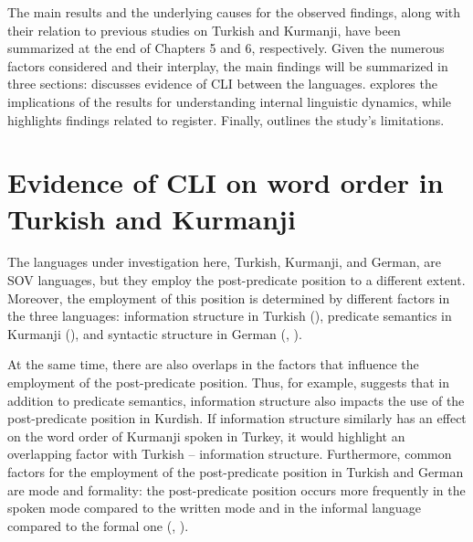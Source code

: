 The main results and the underlying causes for the observed findings, along with their relation to previous studies on Turkish and Kurmanji, have been summarized at the end of Chapters 5 and 6, respectively. Given the numerous factors considered and their interplay, the main findings will be summarized in three sections:  discusses evidence of CLI between the languages.  explores the implications of the results for understanding internal linguistic dynamics, while  highlights findings related to register. Finally,  outlines the study’s limitations.

\section{Evidence of CLI on word order in Turkish and Kurmanji}\label{sec:key:7.1}

The languages under investigation here, Turkish, Kurmanji, and German, are SOV languages, but they employ the post-predicate position to a different extent. Moreover, the employment of this position is determined by different factors in the three languages: information structure in Turkish (\citealt{Erguvanli1984, Erku1983, Issever2003}), predicate semantics in Kurmanji (\citealt{Gundogdu2019, Haig2018, Haig2022}), and syntactic structure in German (\citealt{Frey2015}, \citealt{Muller2023}).

At the same time, there are also overlaps in the factors that influence the employment of the post-predicate position. Thus, for example, \citet{Asadpour2021} suggests that in addition to predicate semantics, information structure also impacts the use of the post-predicate position in Kurdish. If information structure similarly has an effect on the word order of Kurmanji spoken in Turkey, it would highlight an overlapping factor with Turkish -- information structure. Furthermore, common factors for the employment of the post-predicate position in Turkish and German are mode and formality: the post-predicate position occurs more frequently in the spoken mode compared to the written mode and in the informal language compared to the formal one (\citealt{Erguvanli1984, Schroeder2002}, \citealt{Tsehaye2023}).

